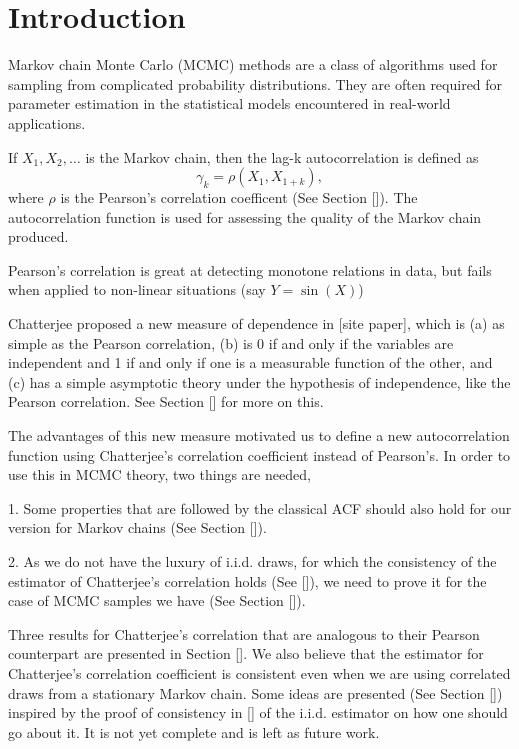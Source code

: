 \chapter{Introduction}

Markov chain Monte Carlo (MCMC) methods are a class of algorithms used for sampling from complicated probability distributions.
They are often required for parameter estimation in the statistical models encountered in real-world applications.

If $X_1, X_2, \dots$ is the Markov chain,
then the lag-k autocorrelation is defined as
$$\gamma_k = \rho(X_1, X_{1+k}),$$
where $\rho$ is the Pearson's correlation coefficent (See Section []).
The autocorrelation function is used for assessing the quality of the Markov chain produced.

Pearson's correlation is great at detecting monotone relations in data,
but fails when applied to non-linear situations (say $Y = \sin(X)$)

Chatterjee proposed a new measure of dependence in [site paper], which is
(a) as simple as the Pearson correlation,
(b) is 0 if and only if the variables are independent and 1 if and only if one is a measurable function of the other, and
(c) has a simple asymptotic theory under the hypothesis of independence, like the Pearson correlation.
See Section [] for more on this.

The advantages of this new measure motivated us to define a new autocorrelation function using Chatterjee's correlation coefficient instead of Pearson's.
In order to use this in MCMC theory, two things are needed,

1. Some properties that are followed by the classical ACF should also hold for our version for Markov chains (See Section []).

2. As we do not have the luxury of i.i.d. draws, for which the consistency of the estimator of Chatterjee's correlation holds (See []),
    we need to prove it for the case of MCMC samples we have (See Section []).

Three results for Chatterjee's correlation that are analogous to their Pearson counterpart are presented in Section [].
We also believe that the estimator for Chatterjee's correlation coefficient is consistent even when we are using correlated draws from a stationary Markov chain.
Some ideas are presented (See Section []) inspired by the proof of consistency in [] of the i.i.d. estimator on how one should go about it.
It is not yet complete and is left as future work.